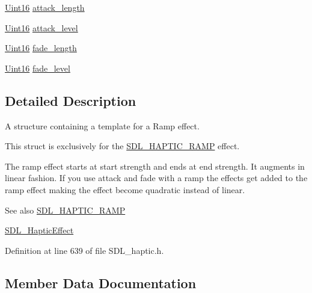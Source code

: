 \begin{DoxyCompactItemize}
\mbox{\hyperlink{_s_d_l__stdinc_8h_a31fcc0a076c9068668173ee26d33e42b}{Uint16}} \mbox{\hyperlink{struct_s_d_l___haptic_ramp_adbcd7ffb05016d442c73e81cc0fcbbd2}{attack\+\_\+length}}
\item 
\mbox{\hyperlink{_s_d_l__stdinc_8h_a31fcc0a076c9068668173ee26d33e42b}{Uint16}} \mbox{\hyperlink{struct_s_d_l___haptic_ramp_a755933bbda14ae9b53c574b9fe6291a0}{attack\+\_\+level}}
\item 
\mbox{\hyperlink{_s_d_l__stdinc_8h_a31fcc0a076c9068668173ee26d33e42b}{Uint16}} \mbox{\hyperlink{struct_s_d_l___haptic_ramp_ad58a8f7cfdf659b45f0503fc56db7436}{fade\+\_\+length}}
\item 
\mbox{\hyperlink{_s_d_l__stdinc_8h_a31fcc0a076c9068668173ee26d33e42b}{Uint16}} \mbox{\hyperlink{struct_s_d_l___haptic_ramp_a66b586f2e6a23a085a7b2854f61752c5}{fade\+\_\+level}}
\end{DoxyCompactItemize}


\subsection{Detailed Description}
A structure containing a template for a Ramp effect. 

This struct is exclusively for the \mbox{\hyperlink{_s_d_l__haptic_8h_af10eb937a64a8f602e9c46682ac0d868}{S\+D\+L\+\_\+\+H\+A\+P\+T\+I\+C\+\_\+\+R\+A\+MP}} effect.

The ramp effect starts at start strength and ends at end strength. It augments in linear fashion. If you use attack and fade with a ramp the effects get added to the ramp effect making the effect become quadratic instead of linear.

\begin{DoxySeeAlso}{See also}
\mbox{\hyperlink{_s_d_l__haptic_8h_af10eb937a64a8f602e9c46682ac0d868}{S\+D\+L\+\_\+\+H\+A\+P\+T\+I\+C\+\_\+\+R\+A\+MP}} 

\mbox{\hyperlink{union_s_d_l___haptic_effect}{S\+D\+L\+\_\+\+Haptic\+Effect}} 
\end{DoxySeeAlso}


Definition at line 639 of file S\+D\+L\+\_\+haptic.\+h.



\subsection{Member Data Documentation}
\mbox{\label{struct_s_d_l___haptic_ramp_adbcd7ffb05016d442c73e81cc0fcbbd2}} 
